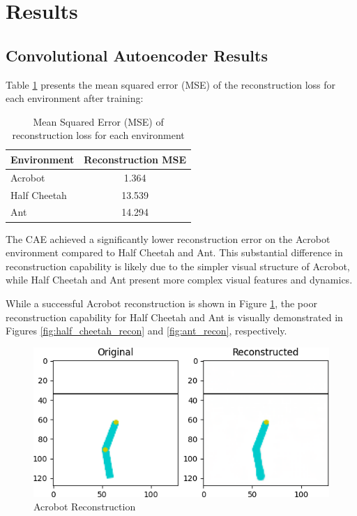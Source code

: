 \section{Results}

\subsection{Convolutional Autoencoder Results}

Table \ref{tab:reconstruction_mse} presents the mean squared error (MSE) of the reconstruction loss for each environment after training:

\begin{table}[h]
    \centering
    \begin{tabular}{@{}lc@{}}
        \toprule
        \textbf{Environment} & \textbf{Reconstruction MSE} \\ \midrule
        Acrobot              & 1.364                       \\
        Half Cheetah         & 13.539                      \\
        Ant                  & 14.294                      \\ \bottomrule
    \end{tabular}
    \caption{Mean Squared Error (MSE) of reconstruction loss for each environment}
    \label{tab:reconstruction_mse}
\end{table}

The CAE achieved a significantly lower reconstruction error on
the Acrobot environment compared to Half Cheetah and Ant.
This substantial difference in reconstruction capability is likely due
to the simpler visual structure of Acrobot, while Half Cheetah and Ant
present more complex visual features and dynamics.

While a successful Acrobot reconstruction is shown
in Figure \ref{fig:acrobot_recon},
the poor reconstruction capability for Half Cheetah and Ant
is visually demonstrated in Figures \ref{fig:half_cheetah_recon} and
\ref{fig:ant_recon}, respectively.

\begin{figure}[h]
    \centering
    \includegraphics[width=.6\textwidth]{figures/ch5/ae_acrobot.png}
    \caption{Acrobot Reconstruction}
    \label{fig:acrobot_recon}
\end{figure}

